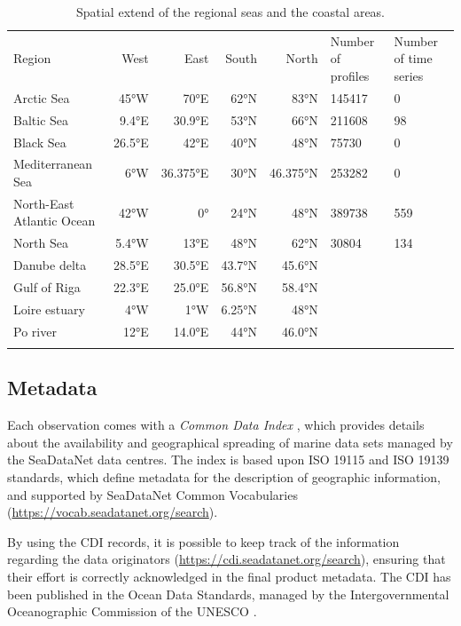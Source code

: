 \documentclass[essd, manuscript]{copernicus}
\begin{document}
\begin{table}[h!]
\caption{Spatial extend of the regional seas and the coastal areas.\label{tab:regions}}
\begin{tabular}{lrrrrll}
\tophline
Region	 					& West		& East		& South 		& North 		& Number of profiles	& Number of time series\\ 
\middlehline	
Arctic Sea 					& 45°W 		& 70°E		& 62°N		& 83°N		& 145417		& 0		\\
Baltic Sea					& 9.4°E		& 30.9°E		& 53°N		& 66°N		& 211608		& 98		\\
Black Sea					& 26.5°E 	& 42°E		& 40°N		& 48°N	 	& 75730		& 0		\\
Mediterranean Sea			& 6°W		& 36.375°E	& 30°N		& 46.375°N	& 253282		& 0		\\
North-East Atlantic Ocean 	& 42°W		& 0° 		& 24°N		& 48°N		& 389738		& 559	\\
North Sea 					& 5.4°W 		& 13°E		& 48°N		& 62°N		& 30804		& 134	\\
\middlehline	
Danube delta					& 28.5°E		& 30.5°E		& 43.7°N 	& 45.6°N		&			& \\
Gulf of Riga 				& 22.3°E 	& 25.0°E 	& 56.8°N 	& 58.4°N		&			& \\
Loire estuary				& 4°W		& 1°W 		& 6.25°N		& 48°N		&			& \\
Po river						& 12°E		& 14.0°E		& 44°N		& 46.0°N		&			& \\
\bottomhline
\end{tabular}
\end{table}

\subsection{Metadata}

Each observation comes with a \textit{Common Data Index} \citep[CDI,][]{Schaap2021,Schaap2022}, which provides details about the availability and geographical spreading of marine data sets managed by the SeaDataNet data centres. The index is based upon ISO 19115 and ISO 19139 standards, which define metadata for the description of geographic information, and supported by SeaDataNet Common Vocabularies (\url{https://vocab.seadatanet.org/search}). 

By using the CDI records, it is possible to keep track of the information regarding the data originators (\url{https://cdi.seadatanet.org/search}), ensuring that their effort is correctly acknowledged in the final product metadata. The CDI has been published in the Ocean Data Standards, managed by the Intergovernmental Oceanographic Commission of the UNESCO \citet{Schaap2021}.
\end{document}
